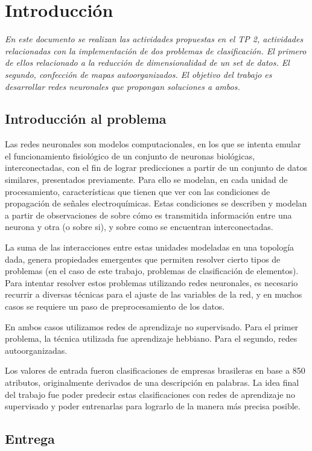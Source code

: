 
\section{Introducción}


\textit{En este documento se realizan las actividades propuestas en el TP 2, actividades relacionadas con la implementación de dos problemas de clasificación.
El primero de ellos relacionado a la reducción de dimensionalidad de un set de datos. El segundo, confección de mapas autoorganizados. El objetivo del
trabajo es desarrollar redes neuronales que propongan soluciones a ambos.}

\subsection{Introducción al problema}
Las redes neuronales son modelos computacionales, en los que se intenta emular el funcionamiento fisiológico de un conjunto de neuronas biológicas, interconectadas, con el fin de lograr predicciones a partir de un conjunto de datos similares, presentados previamente. Para ello se modelan, en cada unidad de procesamiento, características que tienen que ver con las condiciones de propagación de señales electroquímicas. Estas condiciones se describen y modelan a partir de observaciones de sobre cómo es transmitida información entre una neurona y otra (o sobre si), y sobre como se encuentran interconectadas.

La suma de las interacciones entre estas unidades modeladas en una topología dada, genera propiedades emergentes que permiten  resolver cierto tipos de  problemas (en el caso de este trabajo, problemas de clasificación de elementos). 
Para intentar resolver estos problemas utilizando redes neuronales, es necesario recurrir a diversas técnicas para el ajuste de las variables de la red, y en muchos casos se requiere un paso de preprocesamiento de los datos.

En ambos casos utilizamos redes de aprendizaje no supervisado. Para el primer problema, la técnica utilizada fue aprendizaje hebbiano. Para el segundo, redes autoorganizadas. 

Los valores de entrada fueron clasificaciones de empresas brasileras en base a 850 atributos, originalmente derivados de una descripción en palabras. La idea final del trabajo fue poder predecir estas clasificaciones con redes de aprendizaje no supervisado y poder entrenarlas para lograrlo de la manera más precisa posible.

\subsection{Entrega}

